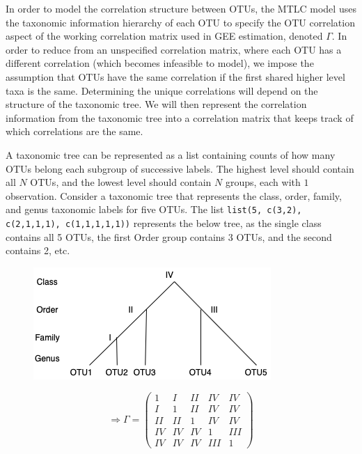 \documentclass[12pt]{article}
\begin{document}
In order to model the correlation structure between OTUs, the MTLC model uses the taxonomic information hierarchy of each OTU to specify the OTU correlation aspect of the working correlation matrix used in GEE estimation, denoted $\Gamma$. In order to reduce from an unspecified correlation matrix, where each OTU has a different correlation (which becomes infeasible to model), we impose the assumption that OTUs have the same correlation if the first shared higher level taxa is the same. Determining the unique correlations will depend on the structure of the taxonomic tree. We will then represent the correlation information from the taxonomic tree into a correlation matrix that keeps track of which correlations are the same.

A taxonomic tree can be represented as a list containing counts of how many OTUs belong each subgroup of successive labels. The highest level should contain all $N$ OTUs, and the lowest level should contain $N$ groups, each with $1$ observation. Consider a taxonomic tree that represents the class, order, family, and genus taxonomic labels for five OTUs. The list \texttt{list(5, c(3,2), c(2,1,1,1), c(1,1,1,1,1))} represents the below tree, as the single class contains all 5 OTUs, the first Order group contains 3 OTUs, and the second contains 2, etc.

\begin{figure}
\begin{minipage}{.5\textwidth}
    \centering
    \includegraphics[width = .8\textwidth]{tree.png}
\end{minipage}%
\begin{minipage}{0.5\textwidth}
    \centering
    $$ \Rightarrow  \Gamma =\begin{pmatrix}
            1 & I & II & IV & IV \\
            I & 1 & II & IV & IV \\
            II & II & 1 & IV & IV \\
            IV & IV & IV & 1 & III \\
            IV & IV & IV & III & 1
      \end{pmatrix} $$
\end{minipage}
\end{figure}
\end{document}

